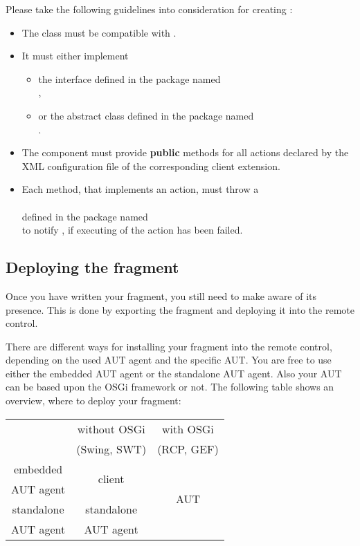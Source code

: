 Please take the following guidelines into consideration for creating
\gdtesterclasses:
\begin{itemize}
  \item The class must be compatible with .
  \item It must either implement
  \begin{itemize}
    \item the interface  defined in the package named\\
        ,\\
	 \item or the abstract class 
	     defined in the package named\\
	     .
  \end{itemize}
  \item The component must provide \textbf{public} methods for all actions
        declared by the XML configuration file of the corresponding \app{}
        client extension.
  \item Each method, that implements an action, must throw a\\
        \\
        defined in the package named\\
        to notify \app{}, if executing of the action has been failed.
\end{itemize}

\subsection{Deploying the fragment}

Once you have written your fragment, you still need to make \app{}
aware of its presence. This is done by exporting the fragment and
deploying it into the \app{} remote control.

There are different ways for installing your fragment into the \app{} remote
control, depending on the used AUT agent and the specific AUT. You are free to
use either the embedded AUT agent or the standalone AUT agent. Also your AUT
can be based upon the OSGi framework or not. The following table shows an
overview, where to deploy your fragment:

\begin{center}
\begin{tabular}{|c||c|c|}
\hline
~ & without OSGi & with OSGi\\
~ & (Swing, SWT) & (RCP, GEF)\\
\hline\hline
embedded & \multirow{2}{*}{\app{} client} & \multirow{4}{*}{AUT}\\
AUT agent & & \\
\hhline{--~}
standalone & standalone & \\
AUT agent  & AUT agent  & \\
\hline
\end{tabular}
\end{center}

